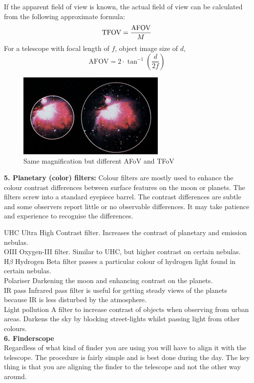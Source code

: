 \documentclass[a4paper,12pt]{extarticle}
\begin{document}
If the apparent field of view is known, the actual field of view can be calculated from the following approximate formula:
\[\text{TFOV}=\frac{\rm AFOV}{M}\]
For a telescope with focal length of $f$, object image size of $d$,
\[\text{AFOV}=2\cdot \tan^{-1}\left(\frac{d}{2f}\right)\]

\begin{figure}[H]
	\centering
	\includegraphics[width=0.4\linewidth]{FOV.png}
	\caption{Same magnification but different AFoV and TFoV}
\end{figure}

\textbf{5. Planetary (color) filters:} Colour filters are mostly used to enhance the colour contrast differences between surface features on the moon or planets. The filters screw into a standard eyepiece barrel. The contrast differences are subtle and some observers report little or no observable differences. It may take patience and experience to recognise the differences.

{\color{blue} UHC} \quad Ultra High Contrast filter. Increases the contrast of planetary and emission nebulas.\\
{\color{blue} OIII} \quad Oxygen-III filter. Similar to UHC, but higher contrast on certain nebulas.\\
{\color{blue} H$\beta$} \quad Hydrogen Beta filter passes a particular colour of hydrogen light found in certain nebulas.\\
{\color{blue} Polariser} \quad Darkening the moon and enhancing contrast on the planets.\\
{\color{blue} IR pass} \quad Infrared pass filter is useful for getting steady views of the planets because IR is less disturbed by the atmosphere.\\
{\color{blue} Light pollution} \quad A filter to increase contrast of objects when observing from
urban areas. Darkens the sky by blocking street-lights whilst passing light from other colours.\\

\textbf{6. Finderscope}\\

Regardless of what kind of finder you are using you will have to align it with the telescope. The procedure is fairly simple and is best done during the day. The key thing is that you are aligning the finder to the telescope and not the other way around.\\
\end{document}
